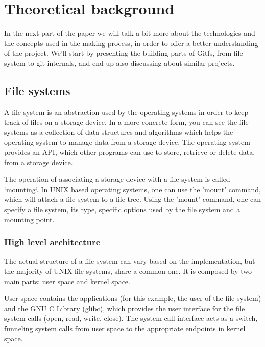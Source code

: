 \chapter{Theoretical background}

\label{ch:theoretical}
In the next part of the paper we will talk a bit more about the technologies and the concepts used in the making process, in order to offer a better understanding of the project. We'll start by presenting the building parts of Gitfs, from file system to git internals, and end up also discussing about similar projects.

\section{File systems}
    A file system is an abstraction used by the operating systems in order to keep track of files on a storage device. In a more concrete form, you can see the file systems as a collection of data structures and algorithms which helps the operating system to manage data from a storage device. The operating system provides an API, which other programs can use to store, retrieve or delete data, from a storage device.

    The operation of associating a storage device with a file system is called `mounting`. In UNIX based operating systems, one can use the 'mount' command, which will attach a file system to a file tree. Using the 'mount' command, one can specify a file system, its type, specific options used by the file system and a mounting point.

    \subsection{High level architecture}
        The actual structure of a file system can vary based on the implementation, but the majority of UNIX file systems, share a common one. It is composed by two main parts: user space and kernel space.

        User space contains the applications (for this example, the user of the file system) and the GNU C Library (glibc), which provides the user interface for the file system calls (open, read, write, close). The system call interface acts as a switch, funneling system calls from user space to the appropriate endpoints in kernel space.

